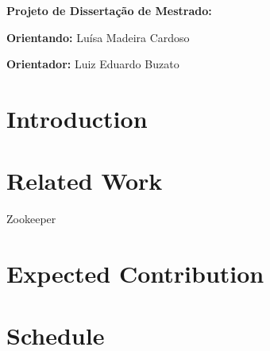 \documentclass[12pt,twoside,a4paper]{article}
\begin{document}
\vskip 15mm

\begin{center} 
\textbf{Projeto de Dissertação de Mestrado:}
\end{center}

\vskip 5mm

\textbf{Orientando:} Luísa Madeira Cardoso

\textbf{Orientador:} Luiz Eduardo Buzato 

\vskip 20mm

\begin{abstract}

\end{abstract}

\newpage
\pagestyle{plain}
\headheight 0.0cm
\headsep 0.0cm
\footskip 2.2cm

\section{Introduction}


\section{Related Work}
\label{sec:related}
Zookeeper \cite{hunt2010zookeeper}
\section{Expected Contribution}
\label{sec:contrib}


 
\section{Schedule}
\label{sec:schedule}


\vskip 15mm

{}

\end{document}
